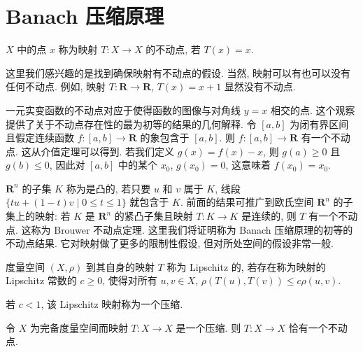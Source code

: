\documentclass[../../main.tex]{subfiles}
\begin{document}
\section{Banach 压缩原理}\label{section:ch10-banach压缩}

\begin{definition}[不动点]\label{definition:ch10-不动点}
$X$ 中的点 $x$ 称为映射 $T:X\to X$ 的不动点, 若 $T(x)=x$.
\end{definition}

这里我们感兴趣的是找到确保映射有不动点的假设. 当然, 映射可以有也可以没有任何不动点. 例如, 映射 $T:\mathbf{R}\to\mathbf{R}$, $T(x)=x+1$ 显然没有不动点.

一元实变函数的不动点对应于使得函数的图像与对角线 $y=x$ 相交的点. 这个观察提供了关于不动点存在性的最为初等的结果的几何解释. 令 $[a,b]$ 为闭有界区间且假定连续函数 $f:[a,b]\to\mathbf{R}$ 的象包含于 $[a,b]$. 则 $f:[a,b]\to\mathbf{R}$ 有一个不动点. 这从介值定理可以得到. 若我们定义 $g(x)=f(x)-x$, 则 $g(a)\geqslant 0$ 且 $g(b)\leqslant 0$, 因此对 $[a,b]$ 中的某个 $x_{0}$, $g(x_{0})=0$, 这意味着 $f(x_{0})=x_{0}$.

$\mathbf{R}^{n}$ 的子集 $K$ 称为是凸的, 若只要 $u$ 和 $v$ 属于 $K$, 线段 $\{tu+(1-t)v\mid 0\leqslant t\leqslant 1\}$ 就包含于 $K$. 前面的结果可推广到欧氏空间 $\mathbf{R}^{n}$ 的子集上的映射: 若 $K$ 是 $\mathbf{R}^{n}$ 的紧凸子集且映射 $T:K\to K$ 是连续的, 则 $T$ 有一个不动点. 这称为 Brouwer 不动点定理. 这里我们将证明称为 Banach 压缩原理的初等的不动点结果. 它对映射做了更多的限制性假设, 但对所处空间的假设非常一般.

\begin{definition}\label{definition:ch10-压缩}
度量空间 $(X,\rho)$ 到其自身的映射 $T$ 称为 Lipschitz 的, 若存在称为映射的 Lipschitz 常数的 $c\geqslant 0$, 使得对所有 $u,v\in X$, $\rho(T(u),T(v))\leqslant c\rho(u,v)$.

若 $c<1$, 该 Lipschitz 映射称为一个压缩.
\end{definition}

\begin{theorem}\label{theorem:ch10-banach压缩}
令 $X$ 为完备度量空间而映射 $T:X\to X$ 是一个压缩. 则 $T:X\to X$ 恰有一个不动点.
\end{theorem}
\end{document}
